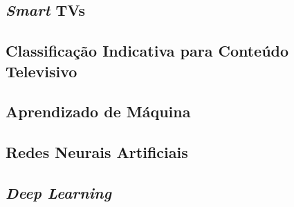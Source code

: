 
\subsection{\emph{Smart} TVs}


\subsection{Classificação Indicativa para Conteúdo Televisivo}


\subsection{Aprendizado de Máquina}


\subsection{Redes Neurais Artificiais}


\subsection{\emph{Deep Learning}}

